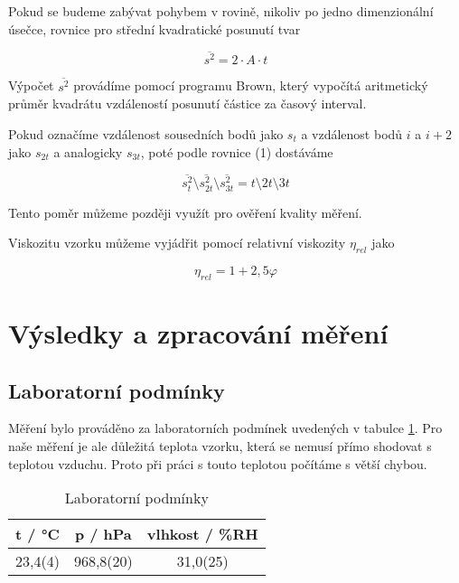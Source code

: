 Pokud se budeme zabývat pohybem v rovině, nikoliv po jedno dimenzionální úsečce, rovnice pro střední kvadratické posunutí tvar

\begin{equation}
    \overline{s^2} = 2 \cdot A \cdot t
\end{equation}

Výpočet \(\overline{s^2}\) provádíme pomocí programu Brown, který vypočítá aritmetický průměr kvadrátu vzdáleností posunutí částice za časový interval.

Pokud označíme vzdálenost sousedních bodů jako \(s_t\) a vzdálenost bodů \(i\) a \(i + 2\) jako \(s_{2t}\) a analogicky \(s_{3t}\), poté podle rovnice (1) dostáváme

\begin{equation}
    \overline{s^2_{t}} \setminus \overline{s^2_{2t}} \setminus \overline{s^2_{3t}} = t \setminus 2t \setminus 3t
\end{equation}

Tento poměr můžeme později využít pro ověření kvality měření.

Viskozitu vzorku můžeme vyjádřit pomocí relativní viskozity \(\eta_{rel}\) jako

\begin{equation}
    \eta_{rel} = 1 + 2,5\varphi
\end{equation}

\section{Výsledky a zpracování měření}

\subsection{Laboratorní podmínky}

    Měření bylo prováděno za laboratorních podmínek uvedených v tabulce \ref{tab:lab_pod}. Pro naše měření je ale důležitá teplota vzorku, která se nemusí přímo shodovat s teplotou vzduchu. Proto při práci s touto teplotou počítáme s větší chybou.

    \begin{table}[h]
        \centering
        \begin{tabular}{|c|c|c|} 
        \hline
            t / °C & p / hPa & vlhkost / \%RH  \\ 
        \hline
            23,4(4)   & 968,8(20)   & 31,0(25)            \\
        \hline
        \end{tabular}
        \caption{Laboratorní podmínky}
        \label{tab:lab_pod}
    \end{table}

